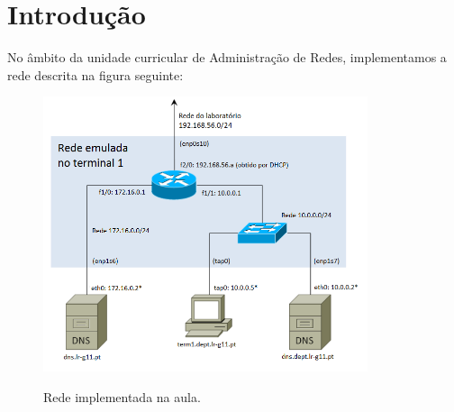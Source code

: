 \section*{Introdução}

No âmbito da unidade curricular de Administração de Redes, implementamos a rede descrita na figura seguinte:\\

\begin{figure}[h]
\centering
\includegraphics[width=0.85\textwidth, height=0.45\textheight]{rede.png}
\label{fig:rede}
\caption{Rede implementada na aula.}
\end{figure}

\newpage